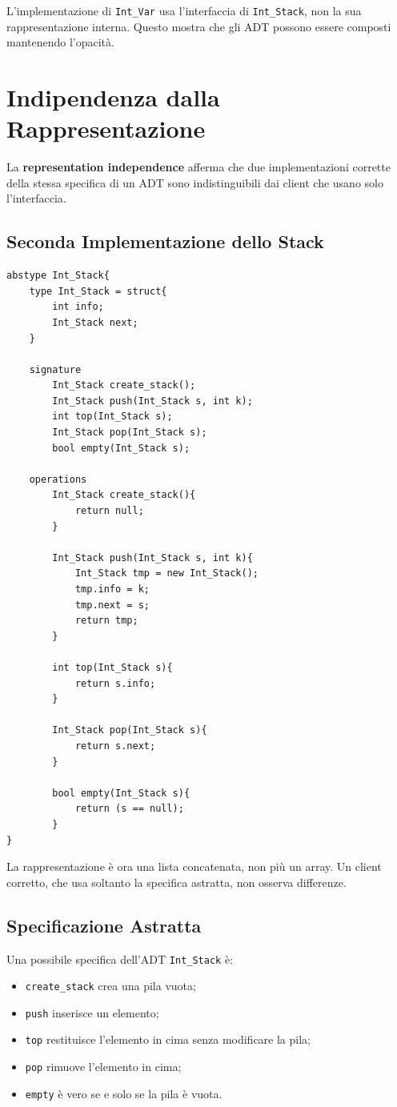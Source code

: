 \documentclass{article}
\begin{document}
L'implementazione di \texttt{Int\_Var} usa l'interfaccia di \texttt{Int\_Stack}, non la sua rappresentazione interna. Questo mostra che gli ADT possono essere composti mantenendo l'opacità.

\section{Indipendenza dalla Rappresentazione}

La \textbf{representation independence} afferma che due implementazioni corrette della stessa specifica di un ADT sono indistinguibili dai client che usano solo l'interfaccia.

\subsection{Seconda Implementazione dello Stack}

\begin{lstlisting}
abstype Int_Stack{
    type Int_Stack = struct{
        int info;
        Int_Stack next;
    }

    signature
        Int_Stack create_stack();
        Int_Stack push(Int_Stack s, int k);
        int top(Int_Stack s);
        Int_Stack pop(Int_Stack s);
        bool empty(Int_Stack s);

    operations
        Int_Stack create_stack(){
            return null;
        }

        Int_Stack push(Int_Stack s, int k){
            Int_Stack tmp = new Int_Stack();
            tmp.info = k;
            tmp.next = s;
            return tmp;
        }

        int top(Int_Stack s){
            return s.info;
        }

        Int_Stack pop(Int_Stack s){
            return s.next;
        }

        bool empty(Int_Stack s){
            return (s == null);
        }
}
\end{lstlisting}

La rappresentazione è ora una lista concatenata, non più un array. Un client corretto, che usa soltanto la specifica astratta, non osserva differenze.

\subsection{Specificazione Astratta}

Una possibile specifica dell'ADT \texttt{Int\_Stack} è:
\begin{itemize}
  \item \texttt{create\_stack} crea una pila vuota;
  \item \texttt{push} inserisce un elemento;
  \item \texttt{top} restituisce l'elemento in cima senza modificare la pila;
  \item \texttt{pop} rimuove l'elemento in cima;
  \item \texttt{empty} è vero se e solo se la pila è vuota.
\end{itemize}
\end{document}
